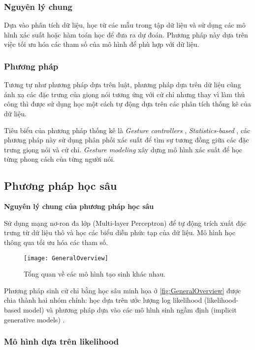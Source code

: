 \subsubsection{Nguyên lý chung}

Dựa vào phân tích dữ liệu, học từ các mẫu trong tập dữ liệu và sử dụng các mô hình xác suất hoặc hàm toán học để đưa ra dự đoán. Phương pháp này dựa trên việc tối ưu hóa các tham số của mô hình để phù hợp với dữ liệu.

\subsubsection{Phương pháp}

Tương tự như phương pháp dựa trên luật, phương pháp dựa trên dữ liệu cũng ánh xạ các đặc trưng của giọng nói tương ứng với cử chỉ nhưng thay vì làm thủ công thì được sử dụng học một cách tự động dựa trên các phân tích thống kê của dữ liệu.

Tiêu biểu của phương pháp thống kê là \textit{Gesture controllers} \cite{levine2010gesture}, \textit{Statistics-based} \cite{yang2020statistics}, các phương pháp này sử dụng phân phối xác suất để tìm sự tương đồng giữa các đặc trưng giọng nói và cử chỉ. \textit{Gesture modeling}  \cite{neff2008gesture} xây dựng mô hình xác suất để học từng phong cách của từng người nói.

\subsection{Phương pháp học sâu}

\textbf{Nguyên lý chung của phương pháp học sâu}

Sử dụng mạng nơ-ron đa lớp (Multi-layer Perceptron) để tự động trích xuất đặc trưng từ dữ liệu thô và học các biểu diễn phức tạp của dữ liệu. Mô hình học thông qua tối ưu hóa các tham số.

\begin{figure}[H]
	\centering
	\texttt{[image: GeneralOverview]}
	\caption{Tổng quan về các mô hình tạo sinh khác nhau.}
	\label{fig:GeneralOverview}
\end{figure}

Phương pháp sinh cử chỉ bằng học sâu minh họa ở \autoref{fig:GeneralOverview} được chia thành hai nhóm chính: học dựa trên ước lượng log likelihood (likelihood-based model)  và phương pháp dựa vào các mô hình sinh ngầm định (implicit generative models) \cite{song2021score}.

\subsubsection{Mô hình dựa trên likelihood}

